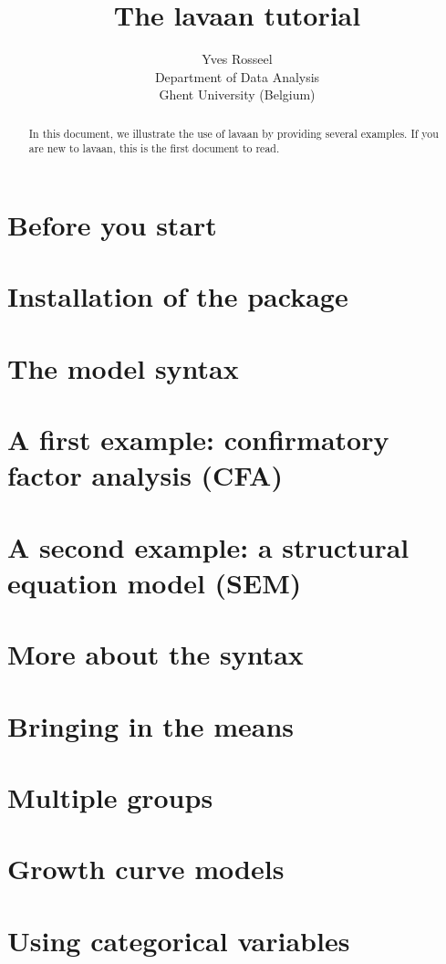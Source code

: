 \documentclass{article}
\title{The \textsf{lavaan} tutorial}
\author{Yves Rosseel\\Department of Data Analysis\\%
  Ghent University (Belgium)}
\newcommand{\pkg}[1]{{\normalfont\fontseries{b}\selectfont #1}}
\begin{document}
\maketitle
\begin{abstract}
In this document, we illustrate the
use of \pkg{lavaan} by providing several examples. If you are new to
\pkg{lavaan}, this is the first document to read.
\end{abstract}

\tableofcontents

\section{Before you start}

\section{Installation of the package}

\section{The model syntax}

\section{A first example: confirmatory factor analysis (CFA)}

\section{A second example: a structural equation model (SEM)}

\section{More about the syntax}

\section{Bringing in the means}

\section{Multiple groups}

\section{Growth curve models}

\section{Using categorical variables}

\end{document}
